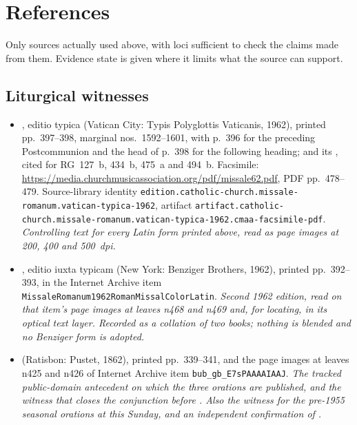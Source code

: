 \section*{References}

Only sources actually used above, with loci sufficient to check the claims made
from them. Evidence state is given where it limits what the source can support.

\subsection*{Liturgical witnesses}

\begin{itemize}[leftmargin=1.2em, itemsep=0.15em]
\item {\raggedright {}, editio typica (Vatican City: Typis Polyglottis
Vaticanis, 1962), printed pp.~397--398, marginal nos.\ 1592--1601, with p.~396
for the preceding Postcommunion and the head of p.~398 for the following
heading; and its , cited for RG~127~b, 434~b, 475~a
and 494~b. Facsimile:
\url{https://media.churchmusicassociation.org/pdf/missale62.pdf},
PDF pp.~478--479. Source-library identity
\texttt{edition.\allowbreak catholic-church.\allowbreak missale-romanum.\allowbreak vatican-typica-1962},
artifact
\texttt{artifact.\allowbreak catholic-church.\allowbreak missale-romanum.\allowbreak vatican-typica-1962.\allowbreak cmaa-facsimile-pdf}.
\textit{Controlling text for every Latin form printed above, read as page images
at 200, 400 and 500~dpi.}\par}
\item {}, editio iuxta typicam (New York: Benziger
Brothers, 1962), printed pp.~392--393, in the Internet Archive item
\texttt{MissaleRomanum1962RomanMissalColorLatin}. \textit{Second 1962 edition,
read on that item's page images at leaves n468 and n469 and, for locating, in
its optical text layer. Recorded as a collation of two books; nothing is
blended and no Benziger form is adopted.}
\item {} (Ratisbon: Pustet, 1862), printed pp.~339--341, and
the page images at leaves n425 and n426 of Internet Archive item
\texttt{bub\_gb\_E7sPAAAAIAAJ}. \textit{The tracked public-domain antecedent on
which the three orations are published, and the witness that closes the
conjunction  before . Also the witness for the pre-1955
seasonal orations at this Sunday, and an independent confirmation of
.}

\end{itemize}
